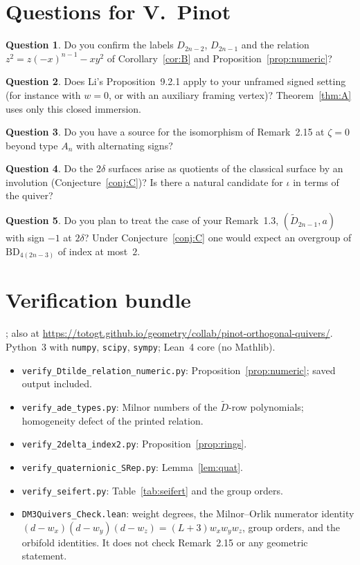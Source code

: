 \documentclass[11pt]{article}
\theoremstyle{definition}
\newtheorem{question}{Question}
\theoremstyle{remark}
\newcommand{\BD}{\mathrm{BD}}
\newcommand{\bundleurl}{https://totogt.github.io/geometry/collab/pinot-orthogonal-quivers/}
\begin{document}
\section{Questions for V.~Pinot}
\begin{question} Do you confirm the labels $D_{2n-2}$, $D_{2n-1}$ and the relation $z^2=z(-x)^{n-1}-xy^2$ of Corollary~\ref{cor:B} and Proposition~\ref{prop:numeric}?\end{question}
\begin{question}\label{q:li} Does Li's Proposition~9.2.1 apply to your unframed signed setting (for instance with $w=0$, or with an auxiliary framing vertex)? Theorem~\ref{thm:A} uses only this closed immersion.\end{question}
\begin{question} Do you have a source for the isomorphism of Remark~2.15 at $\zeta=0$ beyond type $A_n$ with alternating signs?\end{question}
\begin{question} Do the $2\delta$ surfaces arise as quotients of the classical surface by an involution (Conjecture~\ref{conj:C})? Is there a natural candidate for $\iota$ in terms of the quiver?\end{question}
\begin{question} Do you plan to treat the case of your Remark~1.3, $(\widetilde D_{2n-1},a)$ with sign $-1$ at $2\delta$? Under Conjecture~\ref{conj:C} one would expect an overgroup of $\BD_{4(2n-3)}$ of index at most~$2$.\end{question}

\appendix
\section{Verification bundle}
; also at \url{\bundleurl}. Python~3 with \texttt{numpy}, \texttt{scipy}, \texttt{sympy}; Lean~4 core (no Mathlib).
\begin{itemize}[leftmargin=*]
\item \texttt{verify\_Dtilde\_relation\_numeric.py}: Proposition~\ref{prop:numeric}; saved output included.
\item \texttt{verify\_ade\_types.py}: Milnor numbers of the $\widetilde D$-row polynomials; homogeneity defect of the printed relation.
\item \texttt{verify\_2delta\_index2.py}: Proposition~\ref{prop:rings}.
\item \texttt{verify\_quaternionic\_SRep.py}: Lemma~\ref{lem:quat}.
\item \texttt{verify\_seifert.py}: Table~\ref{tab:seifert} and the group orders.
\item \texttt{DM3Quivers\_Check.lean}: weight degrees, the Milnor--Orlik numerator identity $(d-w_x)(d-w_y)(d-w_z)=(L+3)w_xw_yw_z$, group orders, and the orbifold identities. It does not check Remark~2.15 or any geometric statement.
\end{itemize}
\end{document}
